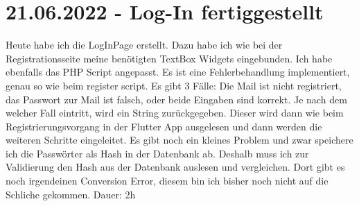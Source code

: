 \documentclass[letterpaper,10pt]{article}
\begin{document}
\section{21.06.2022 - Log-In fertiggestellt}
Heute habe ich die LogInPage erstellt. Dazu habe ich wie bei der Registrationsseite meine benötigten TextBox Widgets eingebunden. Ich habe ebenfalls das PHP Script angepasst. Es ist eine Fehlerbehandlung implementiert, genau so wie beim register script. Es gibt 3 Fälle: Die Mail ist nicht registriert, das Passwort zur Mail ist falsch, oder beide Eingaben sind korrekt. Je nach dem welcher Fall eintritt, wird ein String zurückgegeben. Dieser wird dann wie beim Registrierungsvorgang in der Flutter App ausgelesen und dann werden die weiteren Schritte eingeleitet. Es gibt noch ein kleines Problem und zwar speichere ich die Passwörter als Hash in der Datenbank ab. Deshalb muss ich zur Validierung den Hash aus der Datenbank auslesen und vergleichen. Dort gibt es noch irgendeinen Conversion Error, diesem bin ich bisher noch nicht auf die Schliche gekommen. Dauer: 2h
\printbibliography
\end{document}

